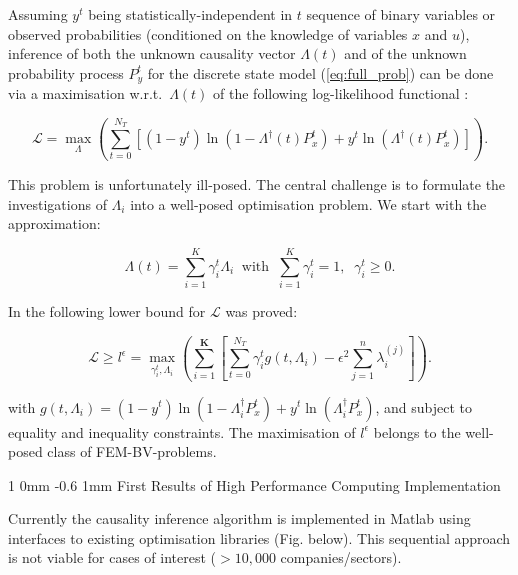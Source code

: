 \documentclass[a0,portrait]{a0poster}
\makeatletter
\renewcommand{\section}{\@startsection
        {section}%
        {1}%
        {0mm}%
        {-0.6\baselineskip}%
        {1mm}%
        {\Large\color{NTNUBlue}\bfseries}}%
\makeatother
\begin{document}
\begin{multicols}{2}
{\large Assuming $y^t$ being statistically-independent in $t$  sequence of binary variables or observed probabilities (conditioned on the knowledge of variables $x$ and $u$), inference of both the unknown causality vector $\Lambda(t)$ and of the unknown probability process $P_y^t$ for the discrete state model  (\ref{eq:full_prob}) can be done via a maximisation w.r.t.~$\Lambda(t)$ of the following log-likelihood functional :}

\begin{equation}
\label{eq:loglik}
\mathcal{L}=\max_{\Lambda} \left( \sum_{t=0}^{N_T}\left[\left(1-y^t\right)\ln\left(1-\Lambda^{\dagger}(t)P_x^t\right)
+y^t\ln\left(\Lambda^{\dagger}(t)P^t_x\right)\right] \right).
\end{equation}

\noindent
{\large This problem is unfortunately ill-posed.  The central challenge is to formulate the investigations of $\Lambda_i$ into a well-posed optimisation problem.  We start with the approximation:} 

$$\Lambda (t) = \sum_{i=1}^{K} \gamma_i^t \Lambda_i \;\; \mbox{with} \;\; \sum_{i=1}^K \gamma_i^t = 1, \;\; \gamma_i^t \ge 0.$$

\noindent
 {\large In \cite{horenko_pnas_2014} the following lower bound for $\mathcal{L}$ was proved:}

\begin{equation}
\label{eq:loglik_lb}
\mathcal{L} \ge l^\epsilon= \max_{\gamma_i^t,\Lambda_i} \left( \sum_{i=1}^{\mathbf{K}}\left[\sum_{t=0}^{N_T}\gamma^t_i g\left(t,\Lambda_i\right)-\epsilon^2\sum_{j=1}^n\lambda_{i}^{(j)}\right] \right).
\end{equation}

\noindent
{\large with $g\left(t,\Lambda_i\right)=\left(1-y^t\right)\ln\left(1-\Lambda^{\dagger}_iP_x^t\right)+y^t\ln\left(\Lambda^{\dagger}_iP^t_x\right)$, and subject to  equality and inequality constraints. The maximisation of $l^\epsilon$ belongs to the well-posed class of FEM-BV-problems.}

\section{First Results of High Performance Computing Implementation}
\label{sec:hpc}

{\large Currently the causality inference algorithm is implemented in Matlab using interfaces to existing optimisation libraries (Fig. below).  This sequential approach is not viable for cases of interest ($> 10,000$ companies/sectors). }


\end{multicols}
\end{document}
